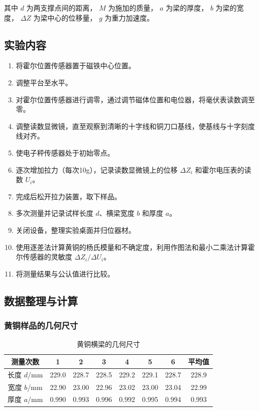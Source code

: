 \documentclass[zihao=5, UTF8]{article}
\theoremstyle{MyLineTheoremStyle} %
\theoremstyle{MyBlockTheoremStyle} %
\theoremstyle{MySubsubsectionStyle} %
\begin{document}
其中 \(d\) 为两支撑点间的距离， \(M\) 为施加的质量， \(a\) 为梁的厚度， \(b\) 为梁的宽度， \(\Delta Z\) 为梁中心的位移量， \(g\) 为重力加速度。

\subsection{实验内容}

\begin{enumerate}
    \item 将霍尔位置传感器置于磁铁中心位置。
    \item 调整平台至水平。
    \item 对霍尔位置传感器进行调零，通过调节磁体位置和电位器，将毫伏表读数调至零。
    \item 调整读数显微镜，直至观察到清晰的十字线和铜刀口基线，使基线与十字刻度线对齐。
    \item 使电子秤传感器处于初始零点。
    \item 逐次增加拉力（每次10g），记录读数显微镜上的位移 $\Delta Z_i$ 和霍尔电压表的读数 $U_i$。
    \item 完成后松开拉力装置，取下样品。
    \item 多次测量并记录试样长度 $d$、横梁宽度 $b$ 和厚度 $a$。
    \item 关闭设备，整理实验桌面并归位器材。
    \item 使用逐差法计算黄铜的杨氏模量和不确定度，利用作图法和最小二乘法计算霍尔传感器的灵敏度 $\Delta Z_i / \Delta U_i$。
    \item 将测量结果与公认值进行比较。
\end{enumerate}

\subsection{数据整理与计算}

\subsubsection{黄铜样品的几何尺寸}

\begin{table}[H]
    \centering
    \begin{tabular}{|c|c|c|c|c|c|c|c|}
        \hline
        测量次数 & 1 & 2 & 3 & 4 & 5 & 6 & 平均值 \\ \hline
        长度 $d$/mm & 229.0 & 228.7 & 228.5 & 229.2 & 229.1 & 228.7 & 228.9 \\ \hline
        宽度 $b$/mm & 22.90 & 23.00 & 22.96 & 23.02 & 23.00 & 23.04 & 22.99 \\ \hline
        厚度 $a$/mm & 0.990 & 0.993 & 0.996 & 0.992 & 0.995 & 0.994 & 0.993 \\ \hline
    \end{tabular}
    \caption{黄铜横梁的几何尺寸}
\end{table}
\end{document}
